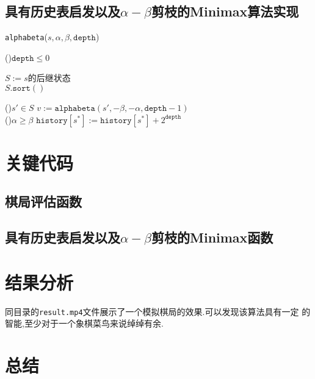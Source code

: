     \subsection{具有历史表启发以及\(\alpha-\beta\)剪枝的Minimax算法实现}
    \begin{algorithm*}
		\caption{\texttt{alphabeta}(\(s,\alpha,\beta,\mathtt{depth}\))}
        
        \If(){\(\mathtt{depth} \le 0\)}{
        }

        \(S := s\)的后继状态 \\

        \(S.\mathtt{sort}()\) 

        \For(){\(s' \in S\)}{
            \(v := \mathtt{alphabeta}(s',-\beta, -\alpha, \mathtt{depth} - 1)\) \\
            \If(){\(\alpha \ge \beta\)}{
                \Break
            }
        }
        \(\mathtt{history}[s^*] := \mathtt{history}[s^*] + 2^\mathtt{depth}\) 
        \Return{\(\alpha\)}
    \end{algorithm*}
    \section{关键代码}

    \subsection{棋局评估函数}


    \subsection{具有历史表启发以及\(\alpha-\beta\)剪枝的Minimax函数}
    

    \section{结果分析}

    同目录的\texttt{result.mp4}文件展示了一个模拟棋局的效果.可以发现该算法具有一定
    的智能,至少对于一个象棋菜鸟来说绰绰有余.

    \section{总结}
    
    

